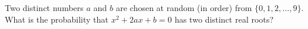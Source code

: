 Two distinct numbers $a$ and $b$ are chosen at random (in order) from $\{0,1,2,\dots,9\}$. What is the probability that $x^2+2ax+b=0$ has two distinct real roots?
